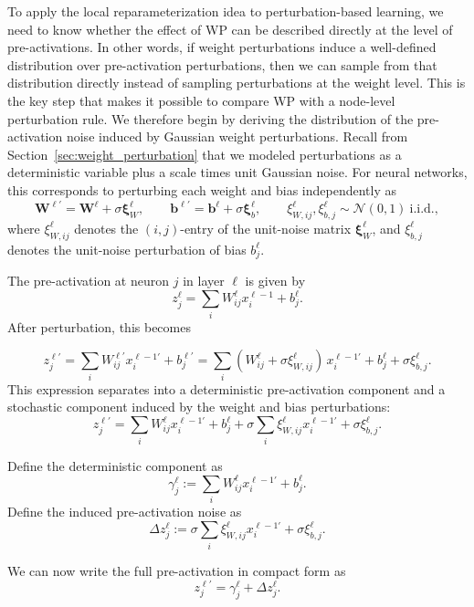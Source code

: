 To apply the local reparameterization idea to perturbation-based learning, we need to know whether the effect of WP can be described directly at the level of pre-activations. In other words, if weight perturbations induce a well-defined distribution over pre-activation perturbations, then we can sample from that distribution directly instead of sampling perturbations at the weight level. This is the key step that makes it possible to compare WP with a node-level perturbation rule. We therefore begin by deriving the distribution of the pre-activation noise induced by Gaussian weight perturbations.
Recall from Section~\ref{sec:weight_perturbation} that we modeled perturbations as a deterministic variable plus a scale times unit Gaussian noise. For neural networks, this corresponds to perturbing each weight and bias independently as
\[
\mathbf{W}^{\ell\prime}
=
\mathbf{W}^\ell + \sigma \boldsymbol{\xi}_W^\ell,
\qquad
\mathbf{b}^{\ell\prime}
=
\mathbf{b}^\ell + \sigma \boldsymbol{\xi}_b^\ell,
\qquad
\xi_{W,ij}^\ell,\xi_{b,j}^\ell \sim \mathcal{N}(0,1)\ \text{i.i.d.},
\]
where \(\xi_{W,ij}^\ell\) denotes the \((i,j)\)-entry of the unit-noise matrix \(\boldsymbol{\xi}_W^\ell\), and \(\xi_{b,j}^\ell\) denotes the unit-noise perturbation of bias \(b_j^\ell\).

The pre-activation at neuron $j$ in layer $\ell$ is given by
\[
z^\ell_j = \sum_i W^\ell_{ij} x^{\ell-1}_i + b_j^\ell.
\]
After perturbation, this becomes

\[
z^{\ell\prime}_j =
\sum_i W^{\ell\prime}_{ij} x^{\ell-1\prime}_i
+
b_j^{\ell\prime}
=
\sum_i (W^\ell_{ij} + \sigma \xi_{W,ij}^\ell) \, x^{\ell-1\prime}_i
+
b_j^\ell
+
\sigma \xi_{b,j}^\ell.
\]
This expression separates into a deterministic pre-activation component and a stochastic component induced by the weight and bias perturbations:
\[
z^{\ell\prime}_j
=
\sum_i W^\ell_{ij} x^{\ell-1\prime}_i
+
b_j^\ell
+
\sigma \sum_i \xi_{W,ij}^\ell x^{\ell-1\prime}_i
+
\sigma \xi_{b,j}^\ell.
\]

Define the deterministic component as
\begin{equation}
\gamma^\ell_j
:=
\sum_i W^\ell_{ij} x^{\ell-1\prime}_i
+
b_j^\ell.
\end{equation}
Define the induced pre-activation noise as
\begin{equation}
\Delta z^\ell_j
:=
\sigma \sum_i \xi_{W,ij}^\ell x^{\ell-1\prime}_i
+
\sigma \xi_{b,j}^\ell.
\label{eq:preact_noise}
\end{equation}

We can now write the full pre-activation in compact form as
\begin{equation}
z^{\ell\prime}_j
=
\gamma^\ell_j
+
\Delta z^\ell_j.
\end{equation}

